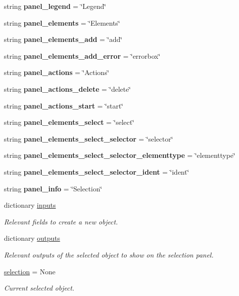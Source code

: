 \begin{DoxyCompactItemize}
\item 
string {\bfseries panel\+\_\+legend} = \char`\"{}Legend\char`\"{}
\item 
string {\bfseries panel\+\_\+elements} = \char`\"{}Elements\char`\"{}
\item 
string {\bfseries panel\+\_\+elements\+\_\+add} = \char`\"{}add\char`\"{}
\item 
string {\bfseries panel\+\_\+elements\+\_\+add\+\_\+error} = \char`\"{}errorbox\char`\"{}
\item 
string {\bfseries panel\+\_\+actions} = \char`\"{}Actions\char`\"{}
\item 
string {\bfseries panel\+\_\+actions\+\_\+delete} = \char`\"{}delete\char`\"{}
\item 
string {\bfseries panel\+\_\+actions\+\_\+start} = \char`\"{}start\char`\"{}
\item 
string {\bfseries panel\+\_\+elements\+\_\+select} = \char`\"{}select\char`\"{}
\item 
string {\bfseries panel\+\_\+elements\+\_\+select\+\_\+selector} = \char`\"{}selector\char`\"{}
\item 
string {\bfseries panel\+\_\+elements\+\_\+select\+\_\+selector\+\_\+elementtype} = \char`\"{}elementtype\char`\"{}
\item 
string {\bfseries panel\+\_\+elements\+\_\+select\+\_\+selector\+\_\+ident} = \char`\"{}ident\char`\"{}
\item 
string {\bfseries panel\+\_\+info} = \char`\"{}Selection\char`\"{}
\item 
dictionary \hyperlink{group___g_u_i_ga3bf8c9ac0786fd812dfca551db862795}{inputs}
\begin{DoxyCompactList}\small\item\em Relevant fields to create a new object. \end{DoxyCompactList}\item 
dictionary \hyperlink{group___g_u_i_gae2e6dcf1628c915d04b82f391253655f}{outputs}
\begin{DoxyCompactList}\small\item\em Relevant outputs of the selected object to show on the selection panel. \end{DoxyCompactList}\item 
\hyperlink{group___g_u_i_ga4cdfedd89ae2ab7854c7062dcb388acd}{selection} = None
\begin{DoxyCompactList}\small\item\em Current selected object. \end{DoxyCompactList}\end{DoxyCompactItemize}


